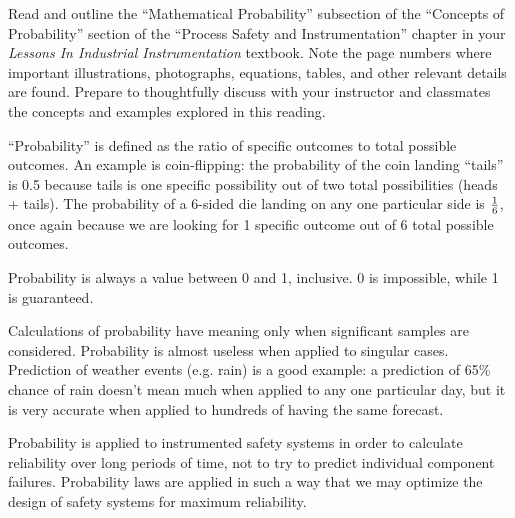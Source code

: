 

Read and outline the ``Mathematical Probability'' subsection of the ``Concepts of Probability'' section of the ``Process Safety and Instrumentation'' chapter in your {\it Lessons In Industrial Instrumentation} textbook.  Note the page numbers where important illustrations, photographs, equations, tables, and other relevant details are found.  Prepare to thoughtfully discuss with your instructor and classmates the concepts and examples explored in this reading.














``Probability'' is defined as the ratio of specific outcomes to total possible outcomes.  An example is coin-flipping: the probability of the coin landing ``tails'' is 0.5 because tails is one specific possibility out of two total possibilities (heads + tails).  The probability of a 6-sided die landing on any one particular side is $1 \over 6$, once again because we are looking for 1 specific outcome out of 6 total possible outcomes.

Probability is always a value between 0 and 1, inclusive.  0 is impossible, while 1 is guaranteed.

\vskip 10pt

Calculations of probability have meaning only when significant samples are considered.  Probability is almost useless when applied to singular cases.  Prediction of weather events (e.g. rain) is a good example: a prediction of 65\% chance of rain doesn't mean much when applied to any one particular day, but it is very accurate when applied to hundreds of having the same forecast.

\vskip 10pt

Probability is applied to instrumented safety systems in order to calculate reliability over long periods of time, not to try to predict individual component failures.  Probability laws are applied in such a way that we may optimize the design of safety systems for maximum reliability.











